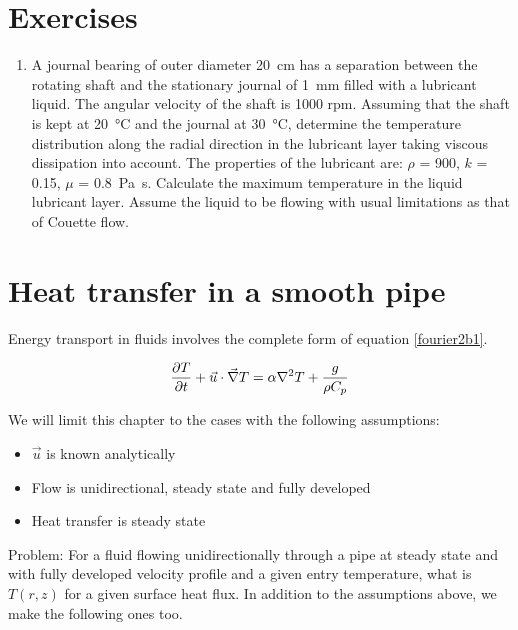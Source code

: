 \section{Exercises}

\begin{enumerate}
 \item A journal bearing of outer diameter \SI{20}{\cm} has a separation between the rotating shaft and the stationary journal of \SI{1}{\mm} filled with a lubricant liquid. The angular velocity of the shaft is 1000 rpm. Assuming that the shaft is kept at \SI{20}{\celsius} and the journal at \SI{30}{\celsius}, determine the temperature distribution along the radial direction in the lubricant layer taking viscous dissipation into account. The properties of the lubricant are: $\rho$ = \SI{900}{\kgpmc}, $k$ = \SI{0.15}{\wpmk}, $\mu$ = \SI{0.8}{\pascal\second}. Calculate the maximum temperature in the liquid lubricant layer. Assume the liquid to be flowing with usual limitations as that of Couette flow.


\end{enumerate}



\section{Heat transfer in a smooth pipe}
Energy transport in fluids involves the complete form of equation \ref{fourier2b1}.

\begin{equation}
\frac{\partial T}{\partial t} + \vec{u} \cdot \vec{\nabla} T  = \alpha \nabla^2 T + \frac{g}{\rho C_p}
\end{equation}

We will limit this chapter to the cases with the following assumptions:

\begin{itemize}
\item $\vec{u}$ is known analytically
\item Flow is unidirectional, steady state and fully developed
\item Heat transfer is steady state
\end{itemize}


Problem: For a fluid flowing unidirectionally through a pipe at steady state and with fully developed velocity profile and a given entry temperature, what is $T(r,z)$ for a given surface heat flux. In addition to the assumptions above, we make the following ones too.


